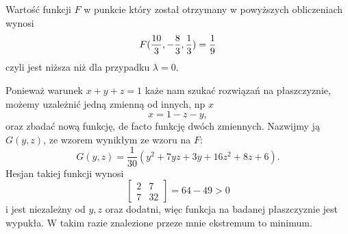 \documentclass{article}[13pt]
\begin{document}
    Wartość funkcji $F$ w punkcie który został otrzymany w powyższych obliczeniach wynosi
    $$F({10\over3},-\frac83,\frac13)=\frac19$$
    czyli jest niższa niż dla przypadku $\lambda=0$.
    \medskip
    

    Ponieważ warunek $x+y+z=1$ każe nam szukać rozwiązań na płaszczyznie, możemy uzależnić jedną zmienną od innych, np $x$ 
    $$x=1-z-y,$$
    oraz zbadać nową funkcję, de facto funkcję dwóch zmiennych. Nazwijmy ją $G(y,z)$, ze wzorem wynikłym ze wzoru na $F$:
    $$G(y,z)=\frac1{30}(y^2+7yz+3y+16z^2+8z+6).$$
    Hesjan takiej funkcji wynosi
    $$
        \begin{bmatrix}
            2 & 7\\
            7 & 32
        \end{bmatrix}=64-49>0
    $$
    i jest niezależny od $y,z$ oraz dodatni, więc funkcja na badanej płaszczyznie jest wypukła. W takim razie znalezione przeze mnie ekstremum to minimum.
\end{document}
